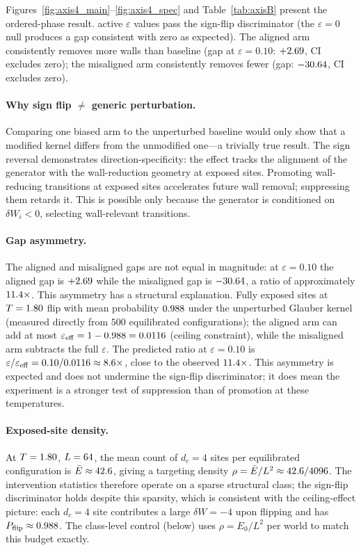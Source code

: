 \documentclass[aps,pre,preprint,superscriptaddress,showpacs]{revtex4-2}
\begin{document}
Figures~\ref{fig:axis4_main}--\ref{fig:axis4_spec} and Table~\ref{tab:axisB}
present the ordered-phase result.
\AxisBSignFlips{} active $\varepsilon$ values pass the sign-flip
discriminator (the $\varepsilon=0$ null produces a gap consistent with
zero as expected).
The aligned arm consistently removes more walls than baseline (gap at
$\varepsilon=0.10$: $+2.69$, CI excludes zero); the
misaligned arm consistently removes fewer (gap: $-30.64$, CI
excludes zero).

\paragraph{Why sign flip $\neq$ generic perturbation.}
Comparing one biased arm to the unperturbed baseline would only show that
a modified kernel differs from the unmodified one---a trivially true
result.
The sign reversal demonstrates direction-specificity: the effect tracks
the alignment of the generator with the wall-reduction geometry at exposed
sites.
Promoting wall-reducing transitions at exposed sites accelerates future
wall removal; suppressing them retards it.
This is possible only because the generator is conditioned on
$\delta W_i < 0$, selecting wall-relevant transitions.

\paragraph{Gap asymmetry.}
The aligned and misaligned gaps are not equal in magnitude: at $\varepsilon=0.10$ the aligned gap is $+2.69$ while the misaligned gap is $-30.64$, a ratio of approximately $11.4\times$.
This asymmetry has a structural explanation.
Fully exposed sites at $T=1.80$ flip with mean probability
$0.988$ under the unperturbed Glauber kernel
(measured directly from $500$ equilibrated configurations);
the aligned arm can add at most
$\varepsilon_{\rm eff} = 1-0.988 = 0.0116$ (ceiling
constraint), while the misaligned arm subtracts the full $\varepsilon$.
The predicted ratio at $\varepsilon=0.10$ is
$\varepsilon/\varepsilon_{\rm eff}=0.10/0.0116\approx 8.6\times$,
close to the observed $11.4\times$.
This asymmetry is expected and does not undermine the sign-flip discriminator;
it does mean the experiment is a stronger test of suppression than of promotion
at these temperatures.

\paragraph{Exposed-site density.}
At $T=1.80$, $L=64$, the mean count of $d_c=4$ sites per
equilibrated configuration is $\bar{E}\approx42.6$,
giving a targeting density $\rho = \bar{E}/L^2 \approx 42.6/4096$.
The intervention statistics therefore operate on a sparse structural class;
the sign-flip discriminator holds despite this sparsity, which is consistent
with the ceiling-effect picture: each $d_c=4$ site contributes a large
$\delta W = -4$ upon flipping and has $P_{\rm flip}\approx0.988$.
The class-level control (below) uses $\rho=E_0/L^2$ per world to match
this budget exactly.
\end{document}
